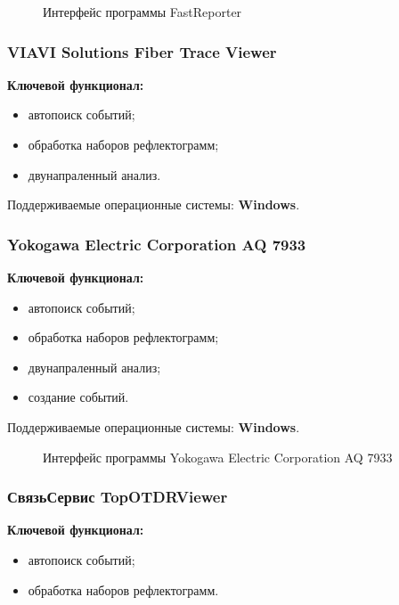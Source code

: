 \begin{figure}[H]
  \caption{Интерфейс программы FastReporter}
  \label{ris:fastreporter}
\end{figure}

\subsubsection{VIAVI Solutions Fiber Trace Viewer}

\textbf{Ключевой функционал:} \cite{web:viavi}
\begin{itemize}
  \item автопоиск событий;
  \item обработка наборов рефлектограмм;
  \item двунапраленный анализ.
\end{itemize}

Поддерживаемые операционные системы: \textbf{Windows}.

\subsubsection{Yokogawa Electric Corporation AQ 7933}

\textbf{Ключевой функционал:} \cite{web:yokogawa}
\begin{itemize}
  \item автопоиск событий;
  \item обработка наборов рефлектограмм;
  \item двунапраленный анализ;
  \item создание событий.
\end{itemize}

Поддерживаемые операционные системы: \textbf{Windows}.

\begin{figure}[H]
  \caption{Интерфейс программы Yokogawa Electric Corporation AQ 7933}
  \label{ris:yokogawa}
\end{figure}

\subsubsection{СвязьСервис TopOTDRViewer}

\textbf{Ключевой функционал:} \cite{web:topotdrviewer}
\begin{itemize}
  \item автопоиск событий;
  \item обработка наборов рефлектограмм.
\end{itemize}

